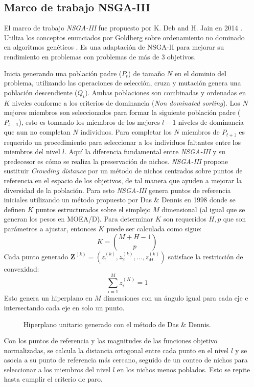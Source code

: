\subsection{Marco de trabajo NSGA-III}

El marco de trabajo \emph{NSGA-III} fue propuesto por K. Deb and H. Jain en 2014 \cite{6600851}. Utiliza los conceptos enunciados por Goldberg sobre ordenamiento no dominado en algoritmos genéticos \cite{goldberg1988genetic}. 
Es una adaptación de NSGA-II para mejorar su rendimiento en problemas con problemas de más de $3$ objetivos.

Inicia generando una población padre ($P_t$) de tamaño $N$ en el dominio del problema, utilizando las operaciones de selección, cruza y mutación genera una población descendiente ($Q_t$).
Ambas poblaciones son combinadas y ordenadas en $K$ niveles conforme a los criterios de dominancia (\textit{Non dominated sorting}). Los $N$ mejores miembros son seleccionados para formar
la siguiente población padre ($P_{t+1}$), esto es tomando los miembros de los mejores $l-1$ niveles de dominancia que aun no completan $N$ individuos. Para completar los $N$ miembros de $P_{t+1}$ es requerido un procedimiento
para seleccionar a los individuos faltantes entre los miembros del nivel $l$. Aquí la diferencia fundamental entre \emph{NSGA-III} y su predecesor es cómo se realiza la preservación de nichos.
\emph{NSGA-III} propone sustituir \textit{Crowding distance} por un método de nichos centrados sobre puntos de referencia en el espacio de los objetivos, de tal manera que ayuden a mejorar la diversidad de la población. Para esto \emph{NSGA-III} genera puntos de referencia
iniciales utilizando un método propuesto por Das \& Dennis en 1998 \cite{Das:1998:NIN:588907.589322} donde se definen $K$ puntos estructurados sobre el simplejo $M$ dimensional (al igual que se generan los pesos en MOEA/D).
Para determinar $K$ son requeridos $H,p$ que son parámetros a ajustar, entonces $K$ puede ser calculada como sigue:
  $$K= {M+H-1 \choose p}$$
Cada punto generado $\bm{Z}^{(k)}=(z_1^{(k)},z_2^{(k)}, \dots, z_M^{(k)})$ satisface la restricción de convexidad:
  $$\sum_{i=1}^M z_i^{(K)} = 1$$
Esto genera un hiperplano en $M$ dimensiones con un ángulo igual para cada eje e intersectando cada eje en solo un punto.

\begin{figure}[h]
 \centering
\caption{Hiperplano unitario generado con el método de Das \& Dennis.}
\end{figure}
Con los puntos de referencia y las magnitudes de las funciones objetivo normalizadas, se calcula la distancia ortogonal entre cada punto en el nivel $l$ y se asocia a su punto de referencia más cercano,
seguido de un conteo de nichos para seleccionar a los miembros del nivel $l$ en los nichos menos poblados. Esto se repite hasta cumplir el criterio de paro.


